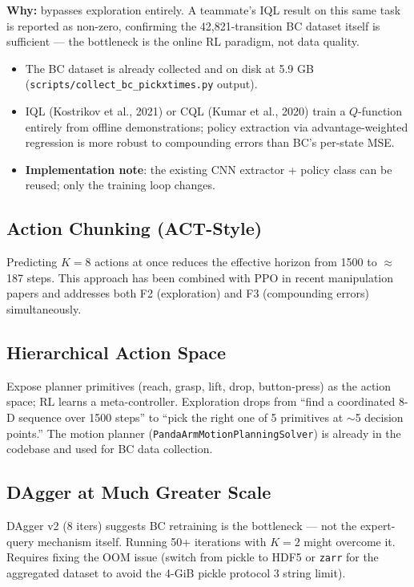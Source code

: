 \documentclass[11pt,letterpaper]{article}
\begin{document}
\textbf{Why:} bypasses exploration entirely. A teammate's IQL result on this same
task is reported as non-zero, confirming the 42,821-transition BC dataset itself
is sufficient --- the bottleneck is the online RL paradigm, not data quality.

\begin{itemize}[nosep]
  \item The BC dataset is already collected and on disk at 5.9 GB
        (\texttt{scripts/collect\_bc\_pickxtimes.py} output).
  \item IQL (Kostrikov et al., 2021) or CQL (Kumar et al., 2020) train a
        $Q$-function entirely from offline demonstrations; policy extraction via
        advantage-weighted regression is more robust to compounding errors
        than BC's per-state MSE.
  \item \textbf{Implementation note}: the existing CNN extractor + policy class
        can be reused; only the training loop changes.
\end{itemize}

\subsection{Action Chunking (ACT-Style)}

Predicting $K=8$ actions at once reduces the effective horizon from 1500 to
$\approx$187 steps. This approach has been combined with PPO in recent manipulation
papers and addresses both F2 (exploration) and F3 (compounding errors) simultaneously.

\subsection{Hierarchical Action Space}

Expose planner primitives (reach, grasp, lift, drop, button-press) as the action
space; RL learns a meta-controller. Exploration drops from ``find a coordinated
8-D sequence over 1500 steps'' to ``pick the right one of 5 primitives at
$\sim$5 decision points.'' The motion planner (\texttt{PandaArmMotionPlanningSolver})
is already in the codebase and used for BC data collection.

\subsection{DAgger at Much Greater Scale}

DAgger v2 (8 iters) suggests BC retraining is the bottleneck — not the
expert-query mechanism itself. Running 50+ iterations with $K=2$ might
overcome it. Requires fixing the OOM issue (switch from pickle to HDF5 or
\texttt{zarr} for the aggregated dataset to avoid the 4-GiB pickle protocol 3
string limit).
\end{document}
